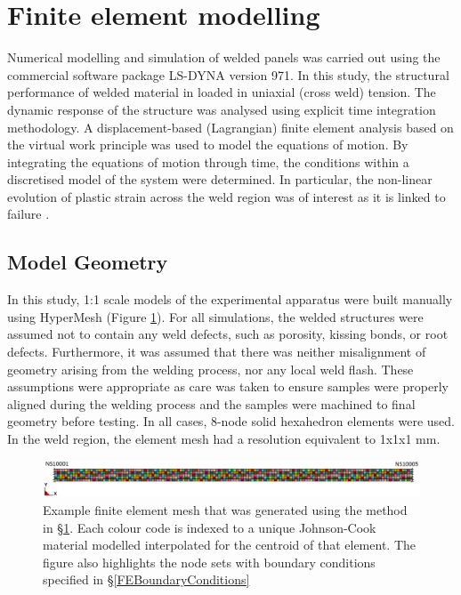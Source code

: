 \section{Finite element modelling}
\label{FE}
Numerical modelling and simulation of welded panels was carried out using the commercial software package LS-DYNA version 971. In this study, the structural performance of welded material in loaded in uniaxial (cross weld) tension. The dynamic response of the structure was analysed using explicit time integration methodology. A displacement-based (Lagrangian) finite element analysis based on the virtual work principle was used to model the equations of motion. By integrating the equations of motion through time, the conditions within a discretised model of the system were determined. In particular, the non-linear evolution of plastic strain across the weld region was of interest as it is linked to failure \cite{Chien2003f}.
\subsection{Model Geometry}
\label{FEModelGeometry}
In this study, 1:1 scale models of the experimental apparatus were built manually using HyperMesh (Figure \ref{fig:UniaxialMesh}). For all simulations, the welded structures were assumed not to contain any weld defects, such as porosity, kissing bonds, or root defects. Furthermore, it was assumed that there was neither misalignment of geometry arising from the welding process, nor any local weld flash. These assumptions were appropriate as care was taken to ensure samples were properly aligned during the welding process and the samples were machined to final geometry before testing. In all cases, 8-node solid hexahedron elements were used. In the weld region, the element mesh had a resolution equivalent to 1x1x1 mm. 

\begin{figure}[h!]
	\centering
	\includegraphics[width=1\linewidth]{uniaxial_load}
	\caption[Mesh]{Example finite element mesh that was generated using the method in \S \ref{FE}. Each colour code is indexed to a unique Johnson-Cook material modelled interpolated for the centroid of that element. The figure also highlights the node sets with boundary conditions specified in \S \ref{FEBoundaryConditions}}	
	\label{fig:UniaxialMesh}
\end{figure} 
